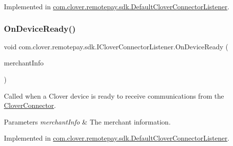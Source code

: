 Implemented in \hyperlink{classcom_1_1clover_1_1remotepay_1_1sdk_1_1_default_clover_connector_listener_af1b973a12629519c039d2fa64da62606}{com.\+clover.\+remotepay.\+sdk.\+Default\+Clover\+Connector\+Listener}.

\mbox{\label{interfacecom_1_1clover_1_1remotepay_1_1sdk_1_1_i_clover_connector_listener_a6c7bff0d9fe64dc624fb175ef33e5299}} 
\subsubsection{\texorpdfstring{On\+Device\+Ready()}{OnDeviceReady()}}
{\footnotesize\ttfamily void com.\+clover.\+remotepay.\+sdk.\+I\+Clover\+Connector\+Listener.\+On\+Device\+Ready (\begin{DoxyParamCaption}\item[{\hyperlink{classcom_1_1clover_1_1remotepay_1_1sdk_1_1_merchant_info}{Merchant\+Info}}]{merchant\+Info }\end{DoxyParamCaption})}



Called when a Clover device is ready to receive communications from the \hyperlink{classcom_1_1clover_1_1remotepay_1_1sdk_1_1_clover_connector}{Clover\+Connector}. 


\begin{DoxyParams}{Parameters}
{\em merchant\+Info} & The merchant information.\\
\hline
\end{DoxyParams}


Implemented in \hyperlink{classcom_1_1clover_1_1remotepay_1_1sdk_1_1_default_clover_connector_listener_add16a6bfe009ef45650f9493425937b7}{com.\+clover.\+remotepay.\+sdk.\+Default\+Clover\+Connector\+Listener}.

\mbox{\label{interfacecom_1_1clover_1_1remotepay_1_1sdk_1_1_i_clover_connector_listener_a816b762344c31db77125abe68fe2c125}} 
